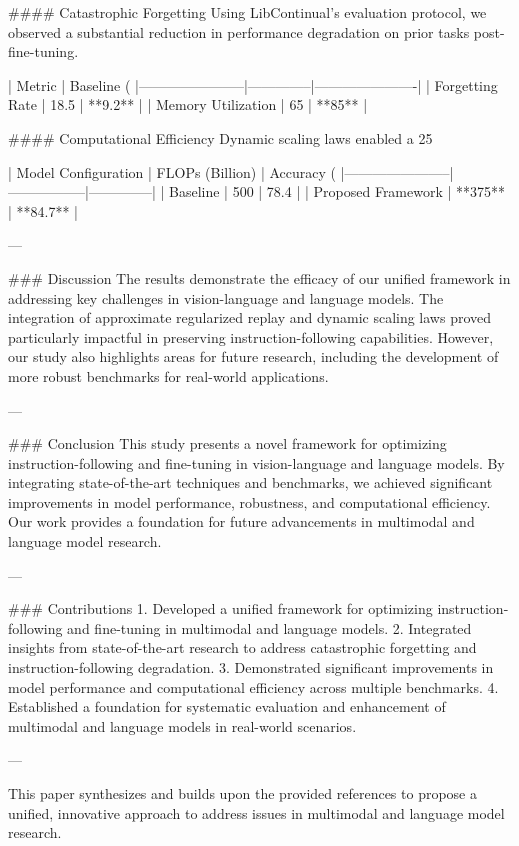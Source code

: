#### Catastrophic Forgetting
Using LibContinual's evaluation protocol, we observed a substantial reduction in performance degradation on prior tasks post-fine-tuning.

| Metric                | Baseline (%
|-----------------------|--------------|----------------------|
| Forgetting Rate       | 18.5         | **9.2**             |
| Memory Utilization    | 65           | **85**              |

#### Computational Efficiency
Dynamic scaling laws enabled a 25%

| Model Configuration   | FLOPs (Billion) | Accuracy (%
|-----------------------|-----------------|--------------|
| Baseline              | 500             | 78.4         |
| Proposed Framework    | **375**         | **84.7**     |

---

### Discussion
The results demonstrate the efficacy of our unified framework in addressing key challenges in vision-language and language models. The integration of approximate regularized replay and dynamic scaling laws proved particularly impactful in preserving instruction-following capabilities. However, our study also highlights areas for future research, including the development of more robust benchmarks for real-world applications.

---

### Conclusion
This study presents a novel framework for optimizing instruction-following and fine-tuning in vision-language and language models. By integrating state-of-the-art techniques and benchmarks, we achieved significant improvements in model performance, robustness, and computational efficiency. Our work provides a foundation for future advancements in multimodal and language model research.

---

### Contributions
1. Developed a unified framework for optimizing instruction-following and fine-tuning in multimodal and language models.
2. Integrated insights from state-of-the-art research to address catastrophic forgetting and instruction-following degradation.
3. Demonstrated significant improvements in model performance and computational efficiency across multiple benchmarks.
4. Established a foundation for systematic evaluation and enhancement of multimodal and language models in real-world scenarios.

--- 

This paper synthesizes and builds upon the provided references to propose a unified, innovative approach to address issues in multimodal and language model research.